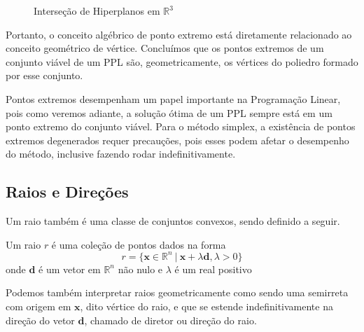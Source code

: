 \begin{itemize}
\begin{figure}[H]
	\caption{Interseção de Hiperplanos em $\mathbb{R}^3$}
	\end{figure}
\end{itemize}

Portanto, o conceito algébrico de ponto extremo está diretamente relacionado ao
conceito geométrico de vértice. Concluímos que os pontos extremos de um conjunto
viável de um PPL são, geometricamente, os vértices do poliedro formado por esse
conjunto.

Pontos extremos desempenham um papel importante na Programação Linear, pois como
veremos adiante, a solução ótima de um PPL sempre está em um ponto extremo do
conjunto viável. Para o método simplex, a existência de pontos extremos degenerados
requer precauções, pois esses podem afetar o desempenho do método, inclusive
fazendo rodar indefinitivamente.

\subsection{Raios e Direções}

Um raio também é uma classe de conjuntos convexos, sendo definido a seguir.

\begin{def:raio}
	Um raio $r$ é uma coleção de pontos dados na forma
	\begin{equation*}
		r = \{\mathbf{x} \in \mathbb{R}^n \ |\  \mathbf{x} + \lambda \mathbf{d}, \lambda > 0\}
	\end{equation*}
	onde $\mathbf{d}$ é um vetor em $\mathbb{R}^n$ não nulo e $\lambda$ é um real positivo
\end{def:raio}

Podemos também interpretar raios geometricamente como sendo uma semirreta com
origem em $\mathbf{x}$, dito vértice do raio, e que se estende indefinitivamente
na direção do vetor $\mathbf{d}$, chamado de diretor ou direção do raio.

